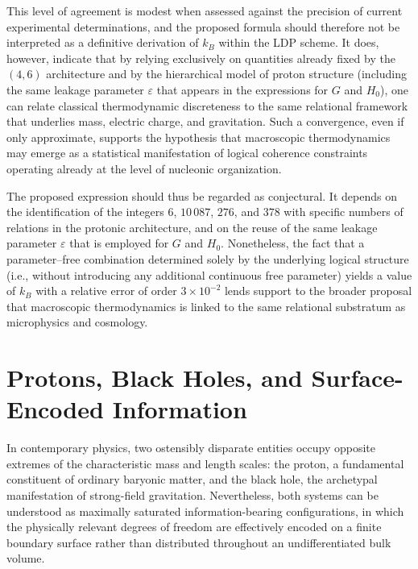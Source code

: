 \documentclass[11pt,a4paper]{article}
\begin{document}
This level of agreement is modest when assessed against the precision of current experimental determinations, and the proposed formula should therefore not be interpreted as a definitive derivation of \(k_B\) within the LDP scheme. It does, however, indicate that by relying exclusively on quantities already fixed by the \((4,6)\) architecture and by the hierarchical model of proton structure (including the same leakage parameter \(\varepsilon\) that appears in the expressions for \(G\) and \(H_0\)), one can relate classical thermodynamic discreteness to the same relational framework that underlies mass, electric charge, and gravitation. Such a convergence, even if only approximate, supports the hypothesis that macroscopic thermodynamics may emerge as a statistical manifestation of logical coherence constraints operating already at the level of nucleonic organization. 

The proposed expression should thus be regarded as conjectural. It depends on the identification of the integers \(6\), \(10\,087\), \(276\), and \(378\) with specific numbers of relations in the protonic architecture, and on the reuse of the same leakage parameter \(\varepsilon\) that is employed for \(G\) and \(H_0\). Nonetheless, the fact that a parameter–free combination determined solely by the underlying logical structure (i.e., without introducing any additional continuous free parameter) yields a value of \(k_B\) with a relative error of order \(3 \times 10^{-2}\) lends support to the broader proposal that macroscopic thermodynamics is linked to the same relational substratum as microphysics and cosmology.

\section{Protons, Black Holes, and Surface-Encoded Information}

In contemporary physics, two ostensibly disparate entities occupy opposite extremes of the characteristic mass and length scales: the proton, a fundamental constituent of ordinary baryonic matter, and the black hole, the archetypal manifestation of strong-field gravitation. Nevertheless, both systems can be understood as maximally saturated information-bearing configurations, in which the physically relevant degrees of freedom are effectively encoded on a finite boundary surface rather than distributed throughout an undifferentiated bulk volume.
\end{document}
